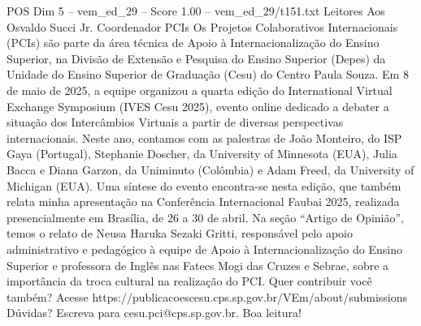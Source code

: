 \begin{textsample}{POS Dim 5 – vem\_ed\_29 – Score 1.00 – vem\_ed\_29/t151.txt}  \label{ex:f5_pos_046}
Leitores Aos Osvaldo Succi Jr.
Coordenador PCIs Os Projetos Colaborativos Internacionais (PCIs) são parte da área técnica de Apoio à Internacionalização do Ensino Superior, na Divisão de Extensão e Pesquisa do Ensino Superior (Depes) da Unidade do Ensino Superior de Graduação (Cesu) do Centro Paula Souza.
Em 8 de maio de 2025, a equipe organizou a quarta edição do International Virtual Exchange Symposium (IVES Cesu 2025), evento online dedicado a debater a situação dos Intercâmbios Virtuais a partir de diversas perspectivas internacionais.
Neste ano, contamos com as palestras de João Monteiro, do ISP Gaya (Portugal), Stephanie Doscher, da University of Minnesota (EUA), Julia Bacca e Diana Garzon, da Uniminuto (Colômbia) e Adam Freed, da University of Michigan (EUA).
Uma síntese do evento encontra-se nesta edição, que também relata minha apresentação na Conferência Internacional Faubai 2025, realizada presencialmente em Brasília, de 26 a 30 de abril.
Na seção “Artigo de Opinião”, temos o relato de Neusa Haruka Sezaki Gritti, responsável pelo apoio administrativo e pedagógico à equipe de Apoio à Internacionalização do Ensino Superior e professora de Inglês nas Fatecs Mogi das Cruzes e Sebrae, sobre a importância da troca cultural na realização do PCI.
Quer contribuir você também?
Acesse https://publicacoescesu.cps.sp.gov.br/VEm/about/submissions Dúvidas?
Escreva para cesu.pci@cps.sp.gov.br.
Boa leitura!

\end{textsample}
